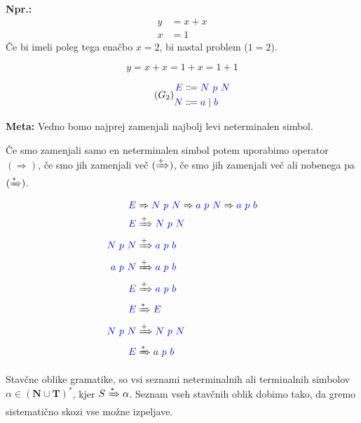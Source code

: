 \documentclass{article}
\newcommand{\Ex}{\textbf{Npr.:}\ }
\newcommand{\Special}[1]{\textbf{#1}}
\newcommand{\Set}[1]{\mathbf{#1}}
\newcommand{\Symbol}[1]{\textcolor{blue}{#1}}
\newcommand{\Grammar}{G}
\newcommand{\Terminals}{\Set{T}}
\newcommand{\NonTerminals}{\Set{N}}
\newcommand{\StartSymbol}{S}
\newcommand{\Arrow}{\Coloneqq}
\newcommand{\Derive}{\Rightarrow}
\newcommand{\DeriveStar}{\xRightarrow{\ast}}
\newcommand{\DerivePlus}{\xRightarrow{+}}
\newcommand{\Seq}{\ }
\newcommand{\Union}{\mathrel{|}}
\newcommand{\Kleene}[1]{#1^\ast}
\begin{document}
\Ex
  \begin{align*}
    y &= x + x\\
    x &= 1
  \end{align*}
  Če bi imeli poleg tega enačbo $x = 2$, bi nastal problem ($1 = 2$).

  \begin{equation*}
    y = x + x = 1 + x = 1 + 1
  \end{equation*}

  \begin{equation}
    \tag{$\Grammar_2$}
    \label{g:plusab}
    \begin{aligned}
      \Symbol{E} &\Arrow \Symbol{N} \Seq \Symbol{p} \Seq \Symbol{N}\\
      \Symbol{N} &\Arrow \Symbol{a} \Union \Symbol{b}
    \end{aligned}
  \end{equation}

\Special{Meta:} Vedno bomo najprej zamenjali najbolj levi neterminalen simbol.

Če smo zamenjali samo en neterminalen simbol potem uporabimo operator $(\Derive)$, če smo jih zamenjali več $(\DerivePlus)$, če smo jih zamenjali več ali nobenega pa $(\DeriveStar)$.
  \begin{align*}
    \Symbol{E} &\Derive \Symbol{N} \Seq \Symbol{p} \Seq \Symbol{N} \Derive \Symbol{a} \Seq \Symbol{p} \Seq \Symbol{N} \Derive \Symbol{a} \Seq \Symbol{p} \Seq \Symbol{b} \\
    \Symbol{E} &\DerivePlus \Symbol{N} \Seq \Symbol{p} \Seq \Symbol{N}\\
    \Symbol{N} \Seq \Symbol{p} \Seq \Symbol{N} &\DerivePlus \Symbol{a} \Seq \Symbol{p} \Seq \Symbol{b}\\
    \Symbol{a} \Seq \Symbol{p} \Seq \Symbol{N} &\DerivePlus \Symbol{a} \Seq \Symbol{p} \Seq \Symbol{b}\\
    \Symbol{E} &\DerivePlus \Symbol{a} \Seq \Symbol{p} \Seq \Symbol{b}\\
    \Symbol{E} &\DeriveStar \Symbol{E}\\
    \Symbol{N} \Seq \Symbol{p} \Seq \Symbol{N} &\DerivePlus \Symbol{N} \Seq \Symbol{p} \Seq \Symbol{N}\\
    \Symbol{E} &\DeriveStar \Symbol{a} \Seq \Symbol{p} \Seq \Symbol{b}
  \end{align*}

Stavčne oblike gramatike, so vsi seznami neterminalnih ali terminalnih simbolov $\alpha \in \Kleene{(\NonTerminals \cup \Terminals)}$, kjer $\StartSymbol \DeriveStar \alpha$.
Seznam vseh stavčnih oblik dobimo tako, da gremo sistematično skozi vse možne izpeljave.
\end{document}
